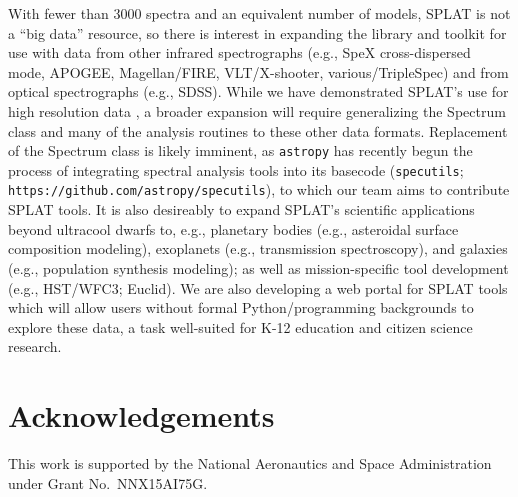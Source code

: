 \documentclass[usenatbib]{basi}
\begin{document}
With fewer than 3000 spectra and an equivalent number of models, SPLAT is not a ``big data'' resource, so there is interest in expanding the library and toolkit for use with data from other infrared spectrographs (e.g., SpeX cross-dispersed mode, APOGEE, Magellan/FIRE, VLT/X-shooter, various/TripleSpec) and from optical spectrographs (e.g., SDSS). While we have demonstrated SPLAT's use for high resolution data  \citep{2016Natur.533..221G}, a broader expansion will require generalizing the Spectrum class and many of the analysis routines to these other data formats.  Replacement of the Spectrum class is likely imminent, as \texttt{astropy} has recently begun the process of integrating spectral analysis tools into its basecode (\texttt{specutils}; \texttt{https://github.com/astropy/specutils}), to which our team aims to contribute SPLAT tools. It is also desireably to expand SPLAT's scientific applications beyond ultracool dwarfs to, e.g., planetary bodies (e.g., asteroidal surface composition modeling), exoplanets (e.g., transmission spectroscopy), and galaxies (e.g., population synthesis modeling); as well as mission-specific tool development (e.g., HST/WFC3; Euclid). We are also developing a web portal for SPLAT tools which will allow users without formal Python/programming backgrounds to explore these data, a task well-suited for K-12 education and citizen science research. 

\section*{Acknowledgements}
This work is supported by the National Aeronautics and Space Administration under Grant No.\ NNX15AI75G.

\end{document}
